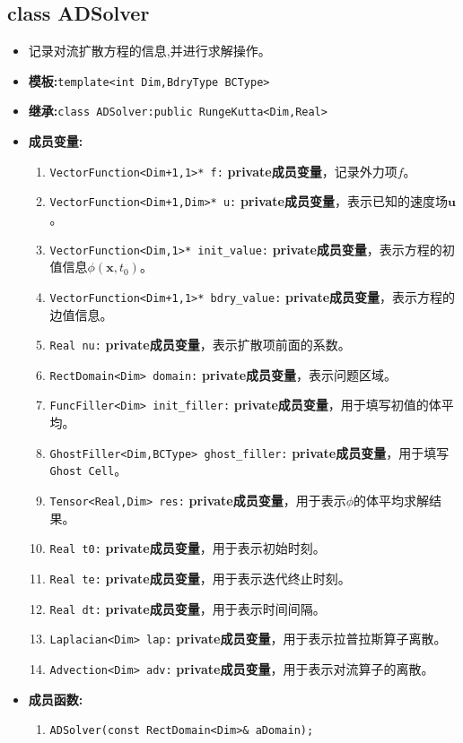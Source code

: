\documentclass[UTF8]{ctexart}
\theoremstyle{plain}
\theoremstyle{definition}
\theoremstyle{remark}
\begin{document}
\subsection{class ADSolver}
\begin{itemize}
    \item 记录对流扩散方程的信息,并进行求解操作。
    \item \textbf{模板:}\texttt{template<int Dim,BdryType BCType>}
    \item \textbf{继承:}\texttt{class ADSolver:public RungeKutta<Dim,Real>}
    \item \textbf{成员变量:}
    \begin{enumerate}
        \item \texttt{VectorFunction<Dim+1,1>* f:} \textbf{private成员变量}，记录外力项$f$。
        \item \texttt{VectorFunction<Dim+1,Dim>* u:} \textbf{private成员变量}，表示已知的速度场$\mathbf{u}$。
        \item \texttt{VectorFunction<Dim,1>* init\_value:} \textbf{private成员变量}，表示方程的初值信息$\phi(\mathbf{x},t_{0})$。
        \item \texttt{VectorFunction<Dim+1,1>* bdry\_value:} \textbf{private成员变量}，表示方程的边值信息。
        \item \texttt{Real nu:} \textbf{private成员变量}，表示扩散项前面的系数。
        \item \texttt{RectDomain<Dim> domain:} \textbf{private成员变量}，表示问题区域。
        \item \texttt{FuncFiller<Dim> init\_filler:} \textbf{private成员变量}，用于填写初值的体平均。
        \item \texttt{GhostFiller<Dim,BCType> ghost\_filler:} \textbf{private成员变量}，用于填写\texttt{Ghost Cell}。
        \item \texttt{Tensor<Real,Dim> res:} \textbf{private成员变量}，用于表示$\phi$的体平均求解结果。
        \item \texttt{Real t0:} \textbf{private成员变量}，用于表示初始时刻。
        \item \texttt{Real te:} \textbf{private成员变量}，用于表示迭代终止时刻。
        \item \texttt{Real dt:} \textbf{private成员变量}，用于表示时间间隔。
        \item \texttt{Laplacian<Dim> lap:} \textbf{private成员变量}，用于表示拉普拉斯算子离散。
        \item \texttt{Advection<Dim> adv:} \textbf{private成员变量}，用于表示对流算子的离散。
    \end{enumerate}
    \item \textbf{成员函数:}
    \begin{enumerate}
        \item \texttt{ADSolver(const RectDomain<Dim>\& aDomain);} 
        

\end{enumerate}
\end{itemize}
\end{document}
